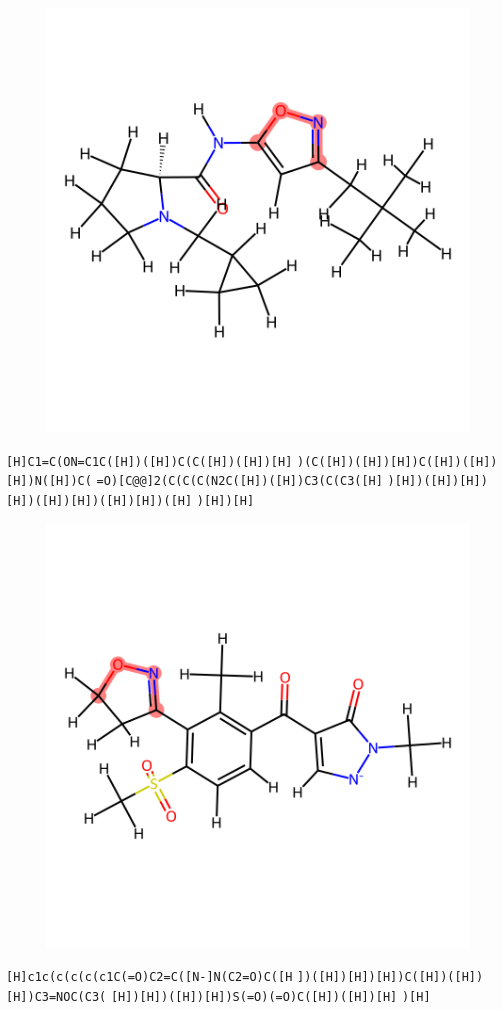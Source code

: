 \documentclass{article}
\begin{document}
\begin{figure}[ht]
\centering
    \includegraphics{mol42.png}
\end{figure}
\verb|[H]C1=C(ON=C1C([H])([H])C(C([H])([H])[H]| \verb|)(C([H])([H])[H])C([H])([H])[H])N([H])C(| \verb|=O)[C@@]2(C(C(C(N2C([H])([H])C3(C(C3([H]| \verb|)[H])([H])[H])[H])([H])[H])([H])[H])([H]| \verb|)[H])[H]|

\begin{figure}[ht]
\centering
    \includegraphics{mol43.png}
\end{figure}
\verb|[H]c1c(c(c(c(c1C(=O)C2=C([N-]N(C2=O)C([H| \verb|])([H])[H])[H])C([H])([H])[H])C3=NOC(C3(| \verb|[H])[H])([H])[H])S(=O)(=O)C([H])([H])[H]| \verb|)[H]|
\end{document}
